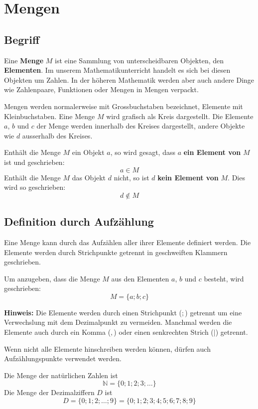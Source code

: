 \newpage
\section{Mengen}

\subsection{Begriff}
Eine \textbf{Menge} $M$ ist eine Sammlung von unterscheidbaren Objekten, den \textbf{Elementen}. Im unserem Mathematikunterricht handelt es sich bei diesen Objekten um Zahlen. In der höheren Mathematik werden aber auch andere Dinge wie Zahlenpaare, Funktionen oder Mengen in Mengen verpackt.

Mengen werden normalerweise mit Grossbuchstaben bezeichnet, Elemente mit Kleinbuchstaben. Eine Menge $M$ wird grafisch als Kreis dargestellt. Die Elemente $a$, $b$  und $c$ der Menge werden innerhalb des Kreises dargestellt, andere Objekte wie $d$ ausserhalb des Kreises.
\begin{center}
\end{center}
Enthält die Menge $M$ ein Objekt $a$, so wird gesagt, dass $a$ \textbf{ein Element von} $M$ ist und geschrieben:
\[
  a \in M
\]
Enthält die Menge $M$ das Objekt $d$ nicht, so ist $d$ \textbf{kein Element von} $M$. Dies wird so geschrieben:
\[
  d \notin M
\]

\subsection{Definition durch Aufzählung}
Eine Menge kann durch das Aufzählen aller ihrer Elemente definiert werden. Die Elemente werden durch Strichpunkte getrennt in geschweiften Klammern geschrieben.

Um anzugeben, dass die Menge $M$ aus den Elementen $a$, $b$ und $c$ besteht, wird geschrieben:
\[
  M = \{ a; b; c \}
\]
\begin{note}
\textbf{Hinweis:} Die Elemente werden durch einen Strichpunkt ($;$) getrennt um eine Verwechslung mit dem Dezimalpunkt zu vermeiden. Manchmal werden die Elemente auch durch ein Komma ($,$) oder einen senkrechten Strich ($|$) getrennt.
\end{note}
Wenn nicht alle Elemente hinschreiben werden können, dürfen auch Aufzählungspunkte verwendet werden.
\begin{example}
  Die Menge der natürlichen Zahlen ist
  \[
    \mathbb{N} = \{0; 1; 2; 3;\ldots \}
  \]
  Die Menge der Dezimalziffern $D$ ist
  \[
    D = \{ 0; 1; 2; \ldots ; 9 \} = \{ 0;1;2;3;4;5;6;7;8;9 \}
  \]
\end{example}

